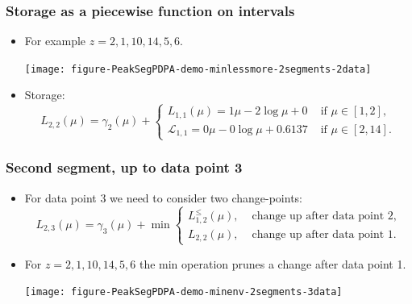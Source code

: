 \documentclass{beamer}
\begin{document}
\begin{frame}
  \frametitle{Storage as a piecewise function on intervals}
  \begin{itemize}
  \item For example $z = 2, 1, 10, 14, 5, 6$.
    \begin{center}
      \texttt{[image: figure-PeakSegPDPA-demo-minlessmore-2segments-2data]}
    \end{center}
  \item Storage: 
    \begin{equation*}
      L_{2,2}(\mu) = \gamma_2(\mu) + 
      \begin{cases}
        L_{1,1}(\mu) = 1\mu - 2\log \mu + 0 & \text{ if } \mu\in[1,2],\\
        \mathcal L_{1,1} = 0\mu -0\log\mu + 0.6137 & \text{ if } \mu\in[2,14].
      \end{cases}
    \end{equation*}
  \end{itemize}
\end{frame}

 
\begin{frame}[fragile]
  \frametitle{Second segment, up to data point 3}
  \begin{itemize}
  \item For data point 3 we need to consider two change-points:
    \begin{equation*}
      L_{2,3}(\mu) =  \gamma_3(\mu) + \min
      \begin{cases}
        L_{1,2}^{\leq}(\mu), & \text{ change up after data point 2},\\
        L_{2,2}(\mu), & \text{ change up after data point 1}. 
      \end{cases}
    \end{equation*}
  \item For $z = 2, 1, 10, 14, 5, 6$ the min operation prunes a
    change after data point 1.
    \begin{center}
      \texttt{[image: figure-PeakSegPDPA-demo-minenv-2segments-3data]}
    \end{center}
  \end{itemize}
\end{frame}
\end{document}
